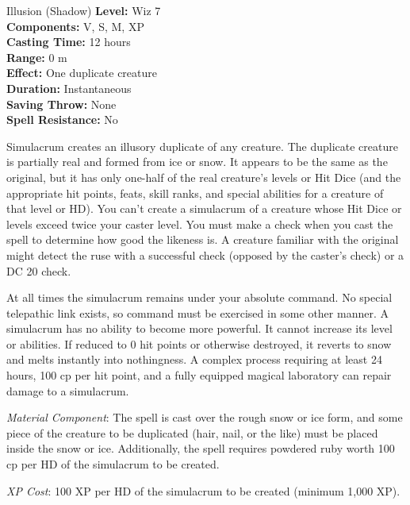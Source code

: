 {Illusion (Shadow)}
{
	\textbf{Level:}
	Wiz 7\\
	\textbf{Components:}
	V, S, M, XP\\
	\textbf{Casting Time:}
	12 hours\\
	\textbf{Range:}
	0 m\\
	\textbf{Effect:}
	One duplicate creature\\
	\textbf{Duration:}
	Instantaneous\\
	\textbf{Saving Throw:}
	None\\
	\textbf{Spell Resistance:}
	No\\
}
{
	Simulacrum creates an illusory duplicate of any creature. The duplicate creature is partially real and formed from ice or snow. It appears to be the same as the original, but it has only one-half of the real creature's levels or Hit Dice (and the appropriate hit points, feats, skill ranks, and special abilities for a creature of that level or HD). You can't create a simulacrum of a creature whose Hit Dice or levels exceed twice your caster level. You must make a  check when you cast the spell to determine how good the likeness is. A creature familiar with the original might detect the ruse with a successful  check (opposed by the caster's  check) or a DC 20  check.

	At all times the simulacrum remains under your absolute command. No special telepathic link exists, so command must be exercised in some other manner. A simulacrum has no ability to become more powerful. It cannot increase its level or abilities. If reduced to 0 hit points or otherwise destroyed, it reverts to snow and melts instantly into nothingness. A complex process requiring at least 24 hours, 100 cp per hit point, and a fully equipped magical laboratory can repair damage to a simulacrum.

	\textit{Material Component}:
	The spell is cast over the rough snow or ice form, and some piece of the creature to be duplicated (hair, nail, or the like) must be placed inside the snow or ice. Additionally, the spell requires powdered ruby worth 100 cp per HD of the simulacrum to be created.

	\textit{XP Cost}:
	100 XP per HD of the simulacrum to be created (minimum 1,000 XP).

}
